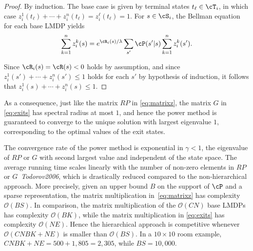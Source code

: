 \begin{proof}
By induction. The base case is given by terminal states $t_\ell\in\cT_i$, in which case $z_i^1(t_\ell)+\cdots+z_i^n(t_\ell) = z_i^\ell(t_\ell) = 1$. For $s\in\cS_i$, the Bellman equation for each base LMDP yields
\begin{align*}
    \sum_{k=1}^n z_i^k(s)=e^{\cR_i(s)/\lambda}\sum_{s'}\cP(s'|s)\sum_{k=1}^n z_i^k(s').
\end{align*}


Since $\cR_i(s)=\cR(s)<0$ holds by assumption, and since $z_i^1(s')+\cdots+z_i^n(s')\leq 1$ holds for each $s'$ by hypothesis of induction, it follows that $z_i^1(s)+\cdots+z_i^n(s)\leq 1$.
\end{proof}
As a consequence, just like the matrix $RP$ in \eqref{eq:matrixz}, the matrix $G$ in \eqref{eq:exits} has spectral radius at most $1$, and hence the power method is guaranteed to converge to the unique solution with largest eigenvalue $1$, corresponding to the optimal values of the exit states.

The convergence rate of the power method is exponential in $\gamma<1$, the eigenvalue of $RP$ or $G$ with second largest value and independent of the state space.
The average running time scales linearly with the number of non-zero elements in $RP$ or $G$~\textit{Todorov2006}, which is drastically reduced compared to the non-hierarchical approach. 
More precisely, given an upper bound $B$ on the support of $\cP$ and a sparse representation, the matrix multiplication in~\eqref{eq:matrixz} has complexity $\mathcal{O}(BS)$. In comparison, the matrix multiplication of the $\mathcal{O}(CN)$ base LMDPs has complexity $\mathcal{O}(BK)$, while the matrix multiplication in \eqref{eq:exits} has complexity $\mathcal{O}(NE)$. Hence the hierarchical approach is competitive whenever $\mathcal{O}(CNBK+NE)$ is smaller than $\mathcal{O}(BS)$. In a $10\times 10$ room example, $CNBK+NE=500+1{,}805=2{,}305$, while $BS=10{,}000$.


